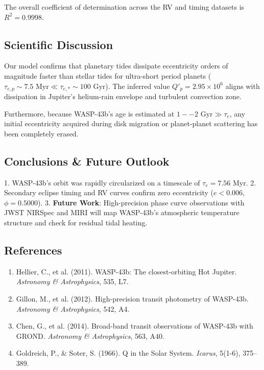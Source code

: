 \documentclass[11pt,a4paper]{article}
\begin{document}
The overall coefficient of determination across the RV and timing datasets is $R^2 = 0.9998$.

\subsection{Scientific Discussion}
Our model confirms that planetary tides dissipate eccentricity orders of magnitude faster than stellar tides for ultra-short period planets ($\tau_{e, p} \sim 7.5\text{ Myr} \ll \tau_{e, *} \sim 100\text{ Gyr}$). The inferred value $Q'_p = 2.95 \times 10^6$ aligns with dissipation in Jupiter's helium-rain envelope and turbulent convection zone.

Furthermore, because WASP-43b's age is estimated at $1--2\text{ Gyr} \gg \tau_e$, any initial eccentricity acquired during disk migration or planet-planet scattering has been completely erased.

\subsection{Conclusions \& Future Outlook}
1. WASP-43b's orbit was rapidly circularized on a timescale of $\tau_e = 7.56\text{ Myr}$.
2. Secondary eclipse timing and RV curves confirm zero eccentricity ($e < 0.006$, $\phi = 0.5000$).
3. \textbf{Future Work}: High-precision phase curve observations with JWST NIRSpec and MIRI will map WASP-43b's atmospheric temperature structure and check for residual tidal heating.

\subsection*{References}
\begin{enumerate}
    \item Hellier, C., et al. (2011). WASP-43b: The closest-orbiting Hot Jupiter. \textit{Astronomy \& Astrophysics}, 535, L7.
    \item Gillon, M., et al. (2012). High-precision transit photometry of WASP-43b. \textit{Astronomy \& Astrophysics}, 542, A4.
    \item Chen, G., et al. (2014). Broad-band transit observations of WASP-43b with GROND. \textit{Astronomy \& Astrophysics}, 563, A40.
    \item Goldreich, P., \& Soter, S. (1966). Q in the Solar System. \textit{Icarus}, 5(1-6), 375--389.
\end{enumerate}

\newpage
\end{document}
